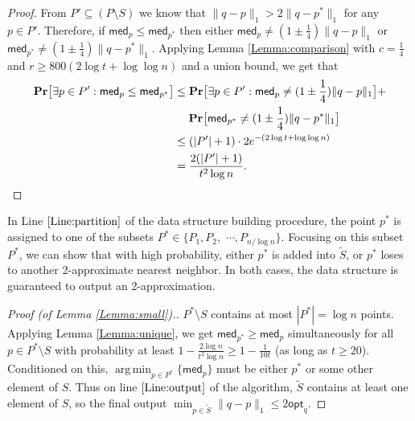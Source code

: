 \documentclass[11pt]{article}
\newcommand{\med}{\mathsf{med}}
\theoremstyle{plain}
\newcommand{\pr}[1]{\text{\bf Pr}\normalfont\bigl[ #1 \bigr]}
\DeclareMathOperator*{\argmin}{arg\,min}
\newcommand{\opt}{\mathsf{opt}}
\begin{document}
\begin{proof}
    From $P' \subseteq (P \setminus S)$ we know that $\lVert q - p\rVert_1  > 2 \lVert q - p^*\rVert_1 $ for any $p \in P'$. Therefore, if $\med_p \leq \med_{p^*}$ then either $\med_p \neq (1\pm \frac{1}{4}) \lVert q - p\rVert_1$ or $\med_{p^*} \neq (1\pm \frac{1}{4}) \lVert q - p^*\rVert_1$. Applying Lemma \ref{Lemma:comparison} with $c = \frac{1}{4}$ and $r \geq 800(2\log t + \log\log n)$ and a union bound, we get that 
    \begin{align*}
        \pr{\exists p \in P': \med_p \leq \med_{p^*}} &\leq \pr{\exists p \in P':  \med_p \neq (1\pm \frac{1}{4}) \lVert q - p\rVert_1} + \\ & \hspace{1.3em} \pr{\med_{p^*} \neq (1\pm \frac{1}{4}) \lVert q - p^*\rVert_1} \\
        &\leq (|P'| +1) \cdot 2e^{-(2\log t + \log\log n)}\\
        &= \frac{2(|P'|+1)}{t^2\log n}.
    \end{align*}
\end{proof}

In Line $\ref{Line:partition}$ of the data structure building procedure, the point $p^*$ is assigned to one of the subsets $P^* \in \{P_1, P_2, $ $\cdots, P_{n/\log n}\}$. Focusing on this subset $P^*$, we can show that with high probability, either $p^*$ is added into $\tilde{S}$, or $p^*$ loses to another 2-approximate nearest neighbor. In both cases, the data structure is guaranteed to output an 2-approximation.
















\begin{proof}[Proof (of Lemma \ref{Lemma:small}).]
    $P^* \setminus S$ contains at most $|P^*| = \log n$ points. Applying Lemma \ref{Lemma:unique}, we get $\med_{p^*} \geq \med_{p}$ simultaneously for all $p \in P^* \setminus S$ with probability at least $1- \frac{2\log n}{t^2 \log n} \geq 1- \frac{1}{10t}$ (as long as $t \geq 20$).  Conditioned on this, $\argmin_{p \in P^*} \{\med_p\}$ must be either $p^*$ or some other element of $S$. Thus on line $\ref{Line:output}$ of the algorithm, $\tilde{S}$ contains at least one element of $S$, so the final output $\min_{p \in \tilde{S}} \| q-p\|_1 \leq 2\opt_q$.
    
\end{proof}
\end{document}
